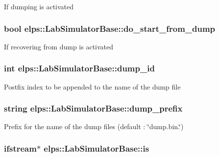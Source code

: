 If dumping is activated \hypertarget{classelps_1_1_lab_simulator_base_ade3a639ae5152292e8d15a0e8cf057d0}{
\subsubsection[{do\+\_\+start\+\_\+from\+\_\+dump}]{\setlength{\rightskip}{0pt plus 5cm}bool elps\+::\+Lab\+Simulator\+Base\+::do\+\_\+start\+\_\+from\+\_\+dump\hspace{0.3cm}{\ttfamily [protected]}}}\label{classelps_1_1_lab_simulator_base_ade3a639ae5152292e8d15a0e8cf057d0}
If recovering from dump is activated \hypertarget{classelps_1_1_lab_simulator_base_a95e1ab73336c28b76439709ad4bfa29a}{
\subsubsection[{dump\+\_\+id}]{\setlength{\rightskip}{0pt plus 5cm}int elps\+::\+Lab\+Simulator\+Base\+::dump\+\_\+id\hspace{0.3cm}{\ttfamily [protected]}}}\label{classelps_1_1_lab_simulator_base_a95e1ab73336c28b76439709ad4bfa29a}
Postfix index to be appended to the name of the dump file \hypertarget{classelps_1_1_lab_simulator_base_aa3b09013a555da1f89fa88861612a9ae}{
\subsubsection[{dump\+\_\+prefix}]{\setlength{\rightskip}{0pt plus 5cm}string elps\+::\+Lab\+Simulator\+Base\+::dump\+\_\+prefix\hspace{0.3cm}{\ttfamily [protected]}}}\label{classelps_1_1_lab_simulator_base_aa3b09013a555da1f89fa88861612a9ae}
Prefix for the name of the dump files (default \+: \char`\"{}dump.\+bin.\char`\"{}) \hypertarget{classelps_1_1_lab_simulator_base_a3c2edadc7f9844cc4761c0aaa187a055}{
\subsubsection[{is}]{\setlength{\rightskip}{0pt plus 5cm}ifstream$\ast$ elps\+::\+Lab\+Simulator\+Base\+::is\hspace{0.3cm}{\ttfamily [protected]}}}\label{classelps_1_1_lab_simulator_base_a3c2edadc7f9844cc4761c0aaa187a055}

